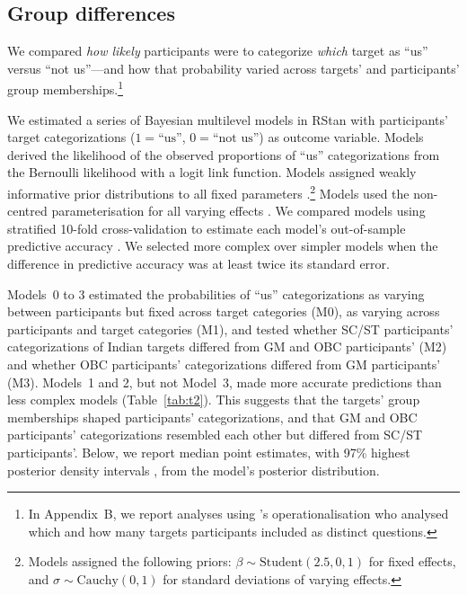 \documentclass[12pt, a4paper]{article}
\begin{document}
\subsection{Group differences}

We compared \emph{how likely} participants were to categorize \emph{which} target as ``us'' versus ``not us''---and how that probability varied across targets' and participants' group memberships.\footnote{In Appendix~B, we report analyses using \citeauthor{dommelen_construing_2015}'s \citeyear{dommelen_construing_2015} operationalisation who analysed which and how many targets participants included as distinct questions. }

We estimated a series of Bayesian multilevel models in RStan \cite{rstan_package} with participants' target categorizations ($1 = \text{``us''}$, $0 = \text{``not us''}$) as outcome variable. Models derived the likelihood of the observed proportions of ``us'' categorizations from the Bernoulli likelihood with a logit link function. Models assigned weakly informative prior distributions to all fixed parameters \cite{gelman_prior_2017}.\footnote{Models assigned the following priors: $\beta \sim \text{Student}(2.5, 0, 1)$ for fixed effects, and $\sigma \sim \text{Cauchy}(0, 1)$ for standard deviations of varying effects.} Models used the non-centred parameterisation for all varying effects \cite{betancourt_hamilton_2015}. We compared models using stratified 10-fold cross-validation to estimate each model's out-of-sample predictive accuracy . We selected more complex over simpler models when the difference in predictive accuracy was at least twice its standard error.

Models~0 to 3 estimated the probabilities of ``us'' categorizations as varying between participants but fixed across target categories (M0), as varying across participants and target categories (M1), and tested whether SC/ST participants' categorizations of Indian targets differed from GM and OBC participants' (M2) and whether OBC participants’ categorizations differed from GM participants' (M3). Models~1 and 2, but not Model~3, made more accurate predictions than less complex models (Table~\ref{tab:t2}). This suggests that the targets' group memberships shaped participants' categorizations, and that GM and OBC participants' categorizations resembled each other but differed from SC/ST participants'. Below, we report median point estimates, with 97\% highest posterior density intervals \cite{coda_package}, from the model's posterior distribution.
\end{document}
